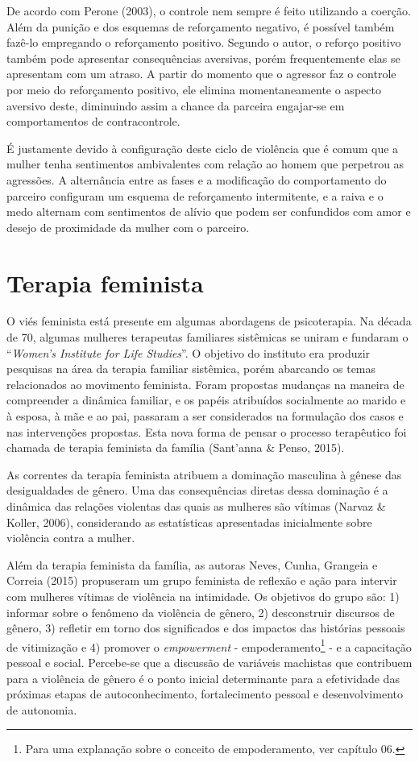 De acordo com Perone (2003), o controle nem sempre é feito utilizando a coerção. Além da punição e dos esquemas de reforçamento negativo, é possível também fazê-lo empregando o reforçamento positivo. Segundo o autor, o reforço positivo também pode apresentar consequências aversivas, porém frequentemente elas se apresentam com um atraso. A partir do momento que o agressor faz o controle por meio do reforçamento positivo, ele elimina momentaneamente o aspecto aversivo deste, diminuindo assim a chance da parceira engajar-se em comportamentos de contracontrole.

É justamente devido à configuração deste ciclo de violência que é comum que a mulher tenha sentimentos ambivalentes com relação ao homem que perpetrou as agressões. A alternância entre as fases e a modificação do comportamento do parceiro configuram um esquema de reforçamento intermitente, e a raiva e o medo alternam com sentimentos de alívio que podem ser confundidos com amor e desejo de proximidade da mulher com o parceiro.

\section*{Terapia feminista}

O viés feminista está presente em algumas abordagens de psicoterapia. Na década de 70, algumas mulheres terapeutas familiares sistêmicas se uniram e fundaram o ``\textit{Women’s Institute for Life Studies}''. O objetivo do instituto era produzir pesquisas na área da terapia familiar sistêmica, porém abarcando os temas relacionados ao movimento feminista. Foram propostas mudanças na maneira de compreender a dinâmica familiar, e os papéis atribuídos socialmente ao marido e à esposa, à mãe e ao pai, passaram a ser considerados na formulação dos casos e nas intervenções propostas. Esta nova forma de pensar o processo terapêutico foi chamada de terapia feminista da família (Sant’anna \& Penso, 2015). 

As correntes da terapia feminista atribuem a dominação masculina à gênese das desigualdades de gênero. Uma das consequências diretas dessa dominação é a dinâmica das relações violentas das quais as mulheres são vítimas (Narvaz \& Koller, 2006), considerando as estatísticas apresentadas inicialmente sobre violência contra a mulher. 

Além da terapia feminista da família, as autoras Neves, Cunha, Grangeia e Correia (2015) propuseram um grupo feminista de reflexão e ação para intervir com mulheres vítimas de violência na intimidade. Os objetivos do grupo são: 1) informar sobre o fenômeno da violência de gênero, 2) desconstruir discursos de gênero, 3) refletir em torno dos significados e dos impactos das histórias pessoais de vitimização e 4) promover o \textit{empowerment} - empoderamento\footnote{Para uma explanação sobre o conceito de empoderamento, ver capítulo 06.} - e a capacitação pessoal e social. Percebe-se que a discussão de variáveis machistas que contribuem para a violência de gênero é o ponto inicial determinante para a efetividade das próximas etapas de autoconhecimento, fortalecimento pessoal e desenvolvimento de autonomia.

